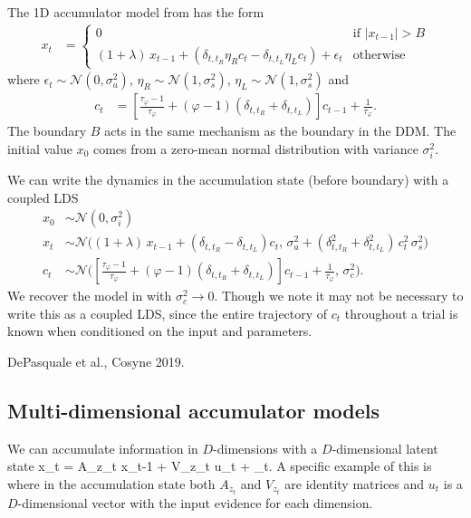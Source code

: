 \documentclass{article}
\begin{document}
The 1D accumulator model from \cite{brunton2013rats} has the form
\begin{align*}
x_t &= 
\begin{cases}
0 & \text{if } |x_{t-1}|>B \\
(1 + \lambda) \, x_{t-1} + \left( \delta_{t,t_R} \eta_R c_t - \delta_{t,t_L} \eta_L c_t \right) + \epsilon_t & \text{otherwise}
\end{cases}
\end{align*}
where $\epsilon_t \sim \mathcal{N}(0,\sigma_a^2)$, $\eta_R \sim \mathcal{N}(1, \sigma_s^2)$, $\eta_L \sim \mathcal{N}(1, \sigma_s^2)$ and 
\begin{align*}
c_t &= \left[ \frac{\tau_\varphi - 1}{\tau_\varphi} + (\varphi - 1) (\delta_{t,t_R} + \delta_{t,t_L}) \right] c_{t-1} + \frac{1}{\tau_\varphi}.
\end{align*}
The boundary $B$ acts in the same mechanism as the boundary in the DDM. The initial value $x_0$ comes from a zero-mean normal distribution with variance $\sigma_i^2$.

We can write the dynamics in the accumulation state (before boundary) with a coupled LDS
\begin{align*}
x_0 & \sim \mathcal{N}(0, \sigma_i^2) \\
x_t & \sim \mathcal{N} \bigg((1 + \lambda) \, x_{t-1} + ( \delta_{t,t_R} -  \delta_{t,t_L} ) c_t , \, \sigma_a^2 + (\delta_{t,t_R}^2 + \delta_{t,t_L}^2)\,  c_t^2 \, \sigma_s^2 \bigg)\\
c_t & \sim \mathcal{N} \bigg(\left[ \frac{\tau_\varphi - 1}{\tau_\varphi} + (\varphi - 1) (\delta_{t,t_R} + \delta_{t,t_L}) \right] c_{t-1} + \frac{1}{\tau_\varphi}, \, \sigma_c^2 \bigg).
\end{align*}
We recover the model in \cite{brunton2013rats} with $\sigma_c^2 \rightarrow 0$. Though we note it may not be necessary to write this as a coupled LDS, since the entire trajectory of $c_t$ throughout a trial is known when conditioned on the input and parameters. 

DePasquale et al., Cosyne 2019.

\subsection{Multi-dimensional accumulator models}
We can accumulate information in $D$-dimensions with a $D$-dimensional latent state
\be
x_t = A_{z_t} x_{t-1} + V_{z_t} u_t + \epsilon_t.
\ee
A specific example of this is where in the accumulation state both $A_{z_t}$ and $V_{z_t}$ are identity matrices and $u_t$ is a $D$-dimensional vector with the input evidence for each dimension. 
\end{document}
